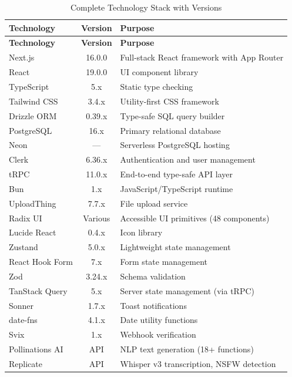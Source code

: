 {\footnotesize
\begin{longtable}{|J{3.5cm}|c|J{7cm}|}
\caption{Complete Technology Stack with Versions} \label{tab:tech-versions} \\
\hline
\textbf{Technology} & \textbf{Version} & \textbf{Purpose} \\
\hline
\endfirsthead
\hline
\textbf{Technology} & \textbf{Version} & \textbf{Purpose} \\
\hline
\endhead
Next.js & 16.0.0 & Full-stack React framework with App Router \\
\hline
React & 19.0.0 & UI component library \\
\hline
TypeScript & 5.x & Static type checking \\
\hline
Tailwind CSS & 3.4.x & Utility-first CSS framework \\
\hline
Drizzle ORM & 0.39.x & Type-safe SQL query builder \\
\hline
PostgreSQL & 16.x & Primary relational database \\
\hline
Neon & --- & Serverless PostgreSQL hosting \\
\hline
Clerk & 6.36.x & Authentication and user management \\
\hline
tRPC & 11.0.x & End-to-end type-safe API layer \\
\hline
Bun & 1.x & JavaScript/TypeScript runtime \\
\hline
UploadThing & 7.7.x & File upload service \\
\hline
Radix UI & Various & Accessible UI primitives (48 components) \\
\hline
Lucide React & 0.4.x & Icon library \\
\hline
Zustand & 5.0.x & Lightweight state management \\
\hline
React Hook Form & 7.x & Form state management \\
\hline
Zod & 3.24.x & Schema validation \\
\hline
TanStack Query & 5.x & Server state management (via tRPC) \\
\hline
Sonner & 1.7.x & Toast notifications \\
\hline
date-fns & 4.1.x & Date utility functions \\
\hline
Svix & 1.x & Webhook verification \\
\hline
Pollinations AI & API & NLP text generation (18+ functions) \\
\hline
Replicate & API & Whisper v3 transcription, NSFW detection \\
\hline
\end{longtable}
}


